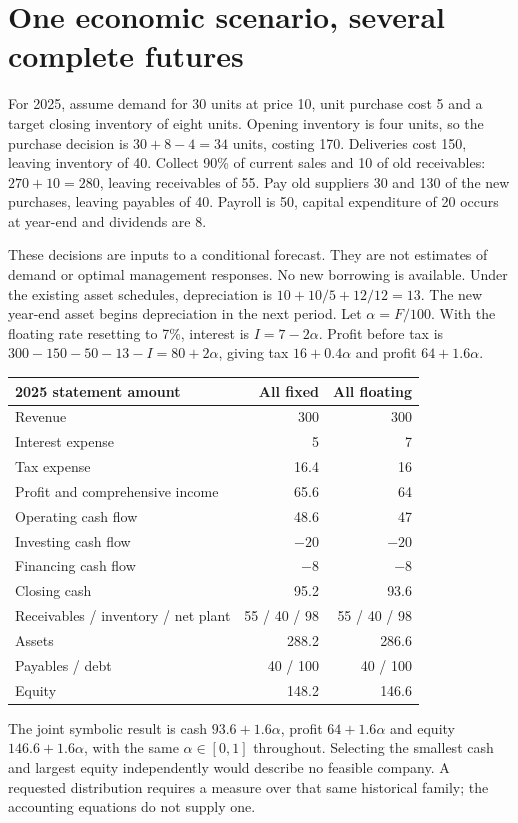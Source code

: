 \section{One economic scenario, several complete futures}

For 2025, assume demand for 30 units at price 10, unit purchase cost 5 and a
target closing inventory of eight units. Opening inventory is four units, so
the purchase decision is $30+8-4=34$ units, costing 170. Deliveries cost 150,
leaving inventory of 40. Collect 90\% of current sales and 10 of old
receivables: $270+10=280$, leaving receivables of 55. Pay old suppliers 30
and 130 of the new purchases, leaving payables of 40. Payroll is 50, capital
expenditure of 20 occurs at year-end and dividends are 8.

These decisions are inputs to a conditional forecast. They are not estimates
of demand or optimal management responses. No new borrowing is available.
Under the existing asset schedules, depreciation is $10+10/5+12/12=13$.
The new year-end asset begins depreciation in the next period. Let
$\alpha=F/100$. With the floating rate resetting to 7\%, interest is
$I=7-2\alpha$. Profit before tax is
$300-150-50-13-I=80+2\alpha$, giving tax $16+0.4\alpha$ and profit
$64+1.6\alpha$.

\begin{center}
\begin{tabular}{lrr}
\toprule 2025 statement amount & All fixed & All floating\\\midrule
Revenue &300&300\\
Interest expense &5&7\\
Tax expense &16.4&16\\
Profit and comprehensive income &65.6&64\\
Operating cash flow &48.6&47\\
Investing cash flow &$-20$&$-20$\\
Financing cash flow &$-8$&$-8$\\\midrule
Closing cash &95.2&93.6\\
Receivables / inventory / net plant &55 / 40 / 98&55 / 40 / 98\\
Assets &288.2&286.6\\
Payables / debt &40 / 100&40 / 100\\
Equity &148.2&146.6\\\bottomrule
\end{tabular}
\end{center}

The joint symbolic result is cash $93.6+1.6\alpha$, profit
$64+1.6\alpha$ and equity $146.6+1.6\alpha$, with the same
$\alpha\in[0,1]$ throughout. Selecting the smallest cash and largest equity
independently would describe no feasible company. A requested distribution
requires a measure over that same historical family; the accounting equations
do not supply one.

